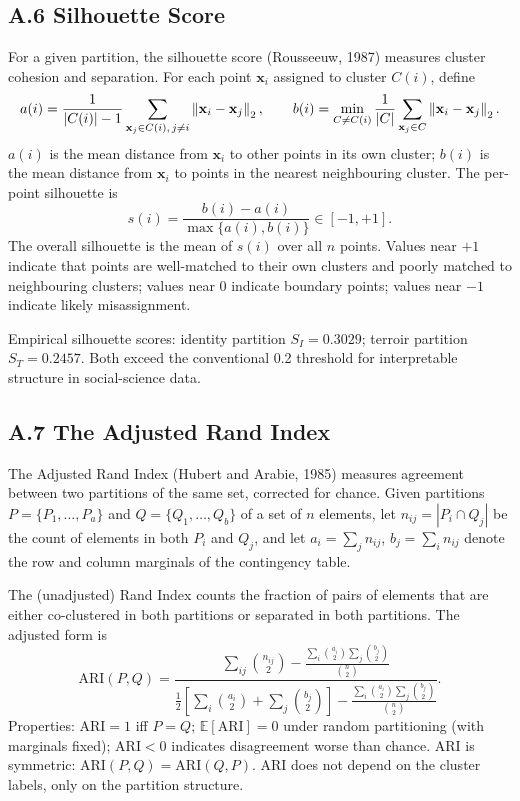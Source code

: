 \documentclass[11pt]{article}
\begin{document}
\subsection*{A.6 Silhouette Score}
For a given partition, the silhouette score (Rousseeuw, 1987) measures cluster cohesion and separation. For each point $\mathbf{x}_i$ assigned to cluster $C(i)$, define
\[
a(i) = \frac{1}{|C(i)| - 1} \sum_{\mathbf{x}_j \in C(i),\, j \neq i} \left\lVert \mathbf{x}_i - \mathbf{x}_j \right\rVert_2,
\qquad
b(i) = \min_{C \neq C(i)} \frac{1}{|C|} \sum_{\mathbf{x}_j \in C} \left\lVert \mathbf{x}_i - \mathbf{x}_j \right\rVert_2.
\]
$a(i)$ is the mean distance from $\mathbf{x}_i$ to other points in its own cluster; $b(i)$ is the mean distance from $\mathbf{x}_i$ to points in the nearest neighbouring cluster. The per-point silhouette is
\[
s(i) = \frac{b(i) - a(i)}{\max\{a(i), b(i)\}} \in [-1, +1].
\]
The overall silhouette is the mean of $s(i)$ over all $n$ points. Values near $+1$ indicate that points are well-matched to their own clusters and poorly matched to neighbouring clusters; values near $0$ indicate boundary points; values near $-1$ indicate likely misassignment.

Empirical silhouette scores: identity partition $S_I = 0.3029$; terroir partition $S_T = 0.2457$. Both exceed the conventional 0.2 threshold for interpretable structure in social-science data.

\subsection*{A.7 The Adjusted Rand Index}
The Adjusted Rand Index (Hubert and Arabie, 1985) measures agreement between two partitions of the same set, corrected for chance. Given partitions $P = \{P_1, \ldots, P_a\}$ and $Q = \{Q_1, \ldots, Q_b\}$ of a set of $n$ elements, let $n_{ij} = |P_i \cap Q_j|$ be the count of elements in both $P_i$ and $Q_j$, and let $a_i = \sum_j n_{ij}$, $b_j = \sum_i n_{ij}$ denote the row and column marginals of the contingency table.

The (unadjusted) Rand Index counts the fraction of pairs of elements that are either co-clustered in both partitions or separated in both partitions. The adjusted form is
\[
\mathrm{ARI}(P, Q) = \frac{\displaystyle \sum_{ij} \binom{n_{ij}}{2} - \frac{\sum_i \binom{a_i}{2} \sum_j \binom{b_j}{2}}{\binom{n}{2}}}{\displaystyle \frac{1}{2}\!\left[\sum_i \binom{a_i}{2} + \sum_j \binom{b_j}{2}\right] - \frac{\sum_i \binom{a_i}{2} \sum_j \binom{b_j}{2}}{\binom{n}{2}}}.
\]
Properties: $\mathrm{ARI} = 1$ iff $P = Q$; $\mathbb{E}[\mathrm{ARI}] = 0$ under random partitioning (with marginals fixed); $\mathrm{ARI} < 0$ indicates disagreement worse than chance. ARI is symmetric: $\mathrm{ARI}(P, Q) = \mathrm{ARI}(Q, P)$. ARI does not depend on the cluster labels, only on the partition structure.
\end{document}
